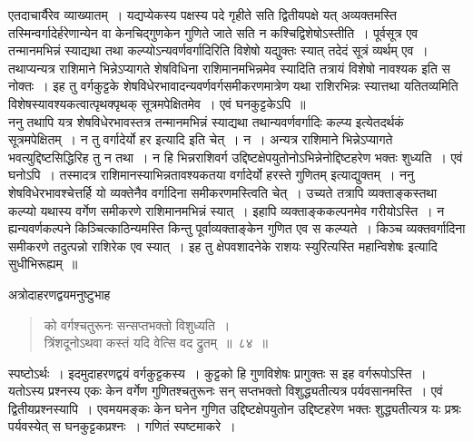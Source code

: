 \documentclass[11pt, openany]{book}
\begin{document}
एतदाचार्यैरेव व्याख्यातम्~। यद्यप्येकस्य पक्षस्य पदे गृहीते सति द्वितीयपक्षे 
यत् अव्यक्तमस्ति तस्मिन्वर्गादेर्हरेणान्येन वा केनचिद्गुणकेन गुणिते जाते सति 
न कश्चिद्विशेषोऽस्तीति~। पूर्वसूत्र एव तन्मानमभिन्नं स्याद्यथा तथा
कल्प्योऽन्यवर्णवर्गादिरिति विशेषो यद्युक्तः स्यात् तदेदं सूत्रं व्यर्थम् एव~। 
तथाप्यन्यत्र राशिमाने भिन्नेऽप्यागते शेषविधिना राशिमानमभिन्नमेव स्यादिति 
तत्रायं विशेषो नावश्यक इति स नोक्तः~। इह तु वर्गकुट्टके शेषविधेरभावादन्यवर्णवर्गसमीकरणमात्रेण यथा राशिरभिन्नः स्यात्तथा यतितव्यमिति 
विशेषस्यावश्यकत्वात्पृथक्पृथक् सूत्रमपेक्षितमेव~। एवं घनकुट्टकेऽपि~॥ \\

\vspace{-3mm}
 ननु तथापि यत्र शेषविधेरभावस्तत्र तन्मानमभिन्नं स्याद्यथा 
तथान्यवर्णवर्गादिः कल्प्य इत्येतदर्थकं सूत्रमपेक्षितम्~। न तु वर्गादेर्यो हर 
इत्यादि इति चेत्~। न~। अन्यत्र राशिमाने भिन्नेऽप्यागते भवत्युद्दिष्टसिद्धिरिह 
तु न तथा~। न हि भिन्नराशिवर्ग उद्दिष्टक्षेपयुतोनोऽभिन्नेनोद्दिष्टहरेण 
भक्तः शुध्यति~। एवं घनोऽपि~। तस्मादत्र राशिमानस्याभिन्नतावश्यकतया 
वर्गादेर्यो हरस्ते गुणितम् इत्याद्युक्तम्~। ननु शेषविधेरभावश्चेत्तर्हि यो व्यक्तेनैव 
वर्गादिना समीकरणमस्त्विति चेत्~। उच्यते तत्रापि व्यक्ताङ्कस्तथा कल्प्यो 
यथास्य वर्गेण समीकरणे राशिमानमभिन्नं स्यात्~। इहापि व्यक्ताङ्ककल्पनमेव 
गरीयोऽस्ति~। न ह्यन्यवर्णकल्पने किञ्चित्काठिन्यमस्ति किन्तु पूर्वाव्यक्ताङ्केन 
गुणित एव स कल्प्यते~। किञ्च व्यक्तवर्गादिना समीकरणे तदुत्पन्नो 
राशिरेक एव स्यात्~। इह तु क्षेपवशादनेके राशयः स्युरित्यस्ति 
महान्विशेषः इत्यादि सुधीभिरूह्यम्~॥

\newpage %
 अत्रोदाहरणद्वयमनुष्टुभाह\textendash 
 \begin{quote}
     \ex
      को वर्गश्चतुरूनः सन्सप्तभक्तो विशुध्यति~। \\
 त्रिंशदूनोऽथवा कस्तं यदि वेत्सि वद द्रुतम्~॥~८४~॥~
 \end{quote}

स्पष्टोऽर्थः~। इदमुदाहरणद्वयं वर्गकुट्टकस्य~। कुट्टको हि गुणविशेषः 
प्रागुक्तः स इह वर्गरूपोऽस्ति~। यतोऽस्य प्रश्नस्य एकः केन वर्गेण 
गुणितश्चतुरूनः सन् सप्तभक्तो विशुद्ध्यतीत्यत्र पर्यवसानमस्ति~। एवं 
द्वितीयप्रश्नस्यापि~। एवमयमङ्कः केन घनेन गुणित उद्दिष्टक्षेपयुतोन उद्दिष्टहरेण भक्तः शुद्ध्यतीत्यत्र यः प्रश्रः पर्यवस्येत् स घनकुट्टकप्रश्नः~। गणितं स्पष्टमाकरे~। \\
\end{document}
